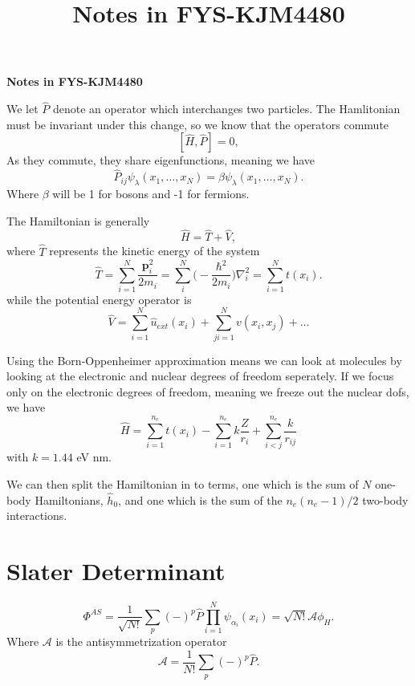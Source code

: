 \documentclass[a4paper, 11pt, notitlepage, english]{article}
\author{}
\title{Notes in FYS-KJM4480}
\newcommand{\op}[1]{\hat{#1}}
\newcommand{\bt}[1]{\boldsymbol{#1}}
\begin{document}
\begin{center}
{\huge \bf Notes in FYS-KJM4480}   
\end{center}

\vspace{1cm}

We let $\op{P}$ denote an operator which interchanges two particles. The Hamlitonian must be invariant under this change, so we know that the operators commute
$$[\op{H}, \op{P}] = 0,$$
As they commute, they share eigenfunctions, meaning we have
$$\op{P}_{ij}\psi_\lambda(x_1,\ldots, x_N) = \beta \psi_\lambda(x_1,\ldots,x_N).$$
Where $\beta$ will be 1 for bosons and -1 for fermions.

The Hamiltonian is generally
$$\op{H} = \op{T} + \op{V},$$
where $\op{T}$ represents the kinetic energy of the system
$$\op{T} = \sum_{i=1}^N \frac{\bt p_i^2}{2m_i} = \sum_{i}^N\bigg(-\frac{\hbar^2}{2m_i}\bigg) \nabla_i^2 = \sum_{i=1}^N t(x_i).$$
while the potential energy operator is
$$\op{V} = \sum_{i=1}^{N} \op{u}_{ext}(x_i) + \sum_{ji=1}^{N}v(x_i,x_j) + \ldots$$

Using the Born-Oppenheimer approximation means we can look at molecules by looking at the electronic and nuclear degrees of freedom seperately. If we focus only on the electronic degrees of freedom, meaning we freeze out the nuclear dofs, we have
$$\op{H} = \sum_{i=1}^{n_e} t(x_i) - \sum_{i=1}^{n_e} k \frac{Z}{r_i} + \sum_{i<j}^{n_e} \frac{k}{r_{ij}}$$
with $k=1.44$ eV nm.

We can then split the Hamiltonian in to terms, one which is the sum of $N$ one-body Hamiltonians, $\op{h}_0$, and one which is the sum of the $n_e(n_e -1)/2$ two-body interactions.

\section*{Slater Determinant}

$$\Phi^{AS} = \frac{1}{\sqrt{N!}} \sum_p (-)^p \op{P} \prod_{i=1}^N \psi_{\alpha_i}(x_i) = \sqrt{N!}\mathcal{A} \phi_H.$$
Where $\mathcal{A}$ is the antisymmetrization operator 
$$\mathcal{A} = \frac{1}{N!}\sum_p (-)^p \op{P}.$$
\end{document}

